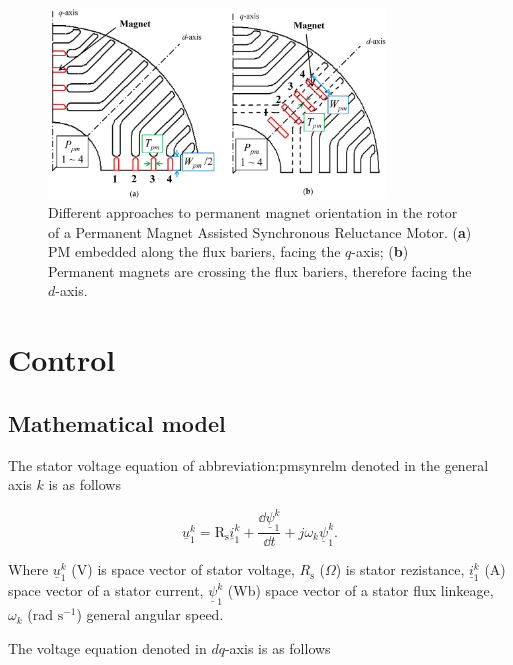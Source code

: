 \documentclass[a4paper, twoside, 11pt]{article}
\begin{document}
    \begin{figure}[htbp!]
            \centering
            \includegraphics[width=0.8\textwidth]{src/png/pmsynrelm-rotor-magnets-position.png}
            \caption{Different approaches to permanent magnet orientation in the rotor of a Permanent Magnet Assisted Synchronous Reluctance Motor. (\textbf{a}) PM embedded along the flux bariers, facing the $q$-axis; (\textbf{b}) Permanent magnets are crossing the flux bariers, therefore facing the $d$-axis. \cite{ngo-performance-analysis-of-synchronous-reluctance-motor-with-limited-amount-of-permanent-magnet}}
            \label{fig:pmsynrelm-rotor-magnets-position}
    \end{figure}

\FloatBarrier
\section{Control}

    \subsection{Mathematical model}
        The stator voltage equation of \gls{abbreviation:pmsynrelm} denoted in the general axis $k$ is as follows

        \begin{equation}
            \underline{u}^k_1 = \text{R}_\text{s} \underline{i}^k_1 + \frac{\dd \underline{\psi}^k_1 }{\dd t} + j \omega_k \underline{\psi}^k_1.
        \end{equation}

        Where $\underline{u}^k_1$ (V) is space vector of stator voltage, $R_\text{s}$ ($\Omega$) is stator rezistance, $\underline{i}^k_1$ (A) space vector of a stator current, $\underline{\psi}^k_1$ (Wb) space vector of a stator flux linkeage, $\omega_k$ (rad $\text{s}^{-1}$) general angular speed.\par
        The voltage equation denoted in $dq$-axis is as follows
\end{document}
